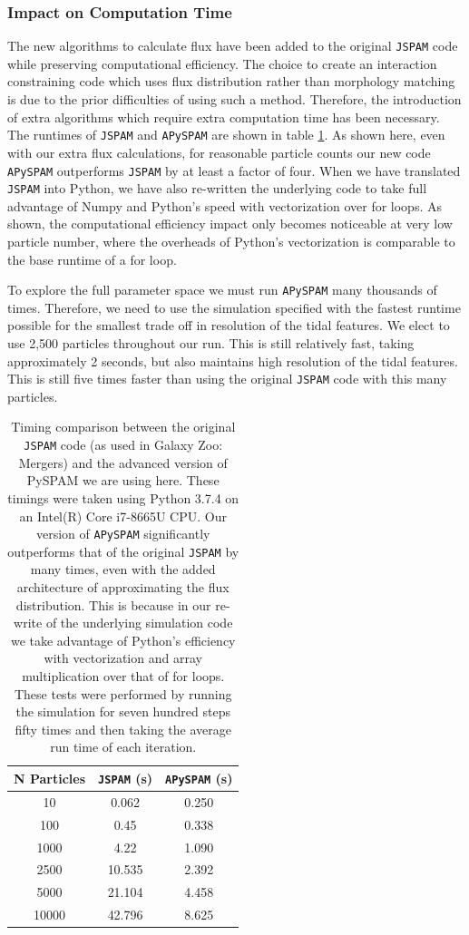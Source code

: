 \subsubsection{Impact on Computation Time}
The new algorithms to calculate flux have been added to the original \texttt{JSPAM} code while preserving computational efficiency. The choice to create an interaction constraining code which uses flux distribution rather than morphology matching is due to the prior difficulties of using such a method. Therefore, the introduction of extra algorithms which require extra computation time has been necessary. The runtimes of \texttt{JSPAM} and \texttt{APySPAM} are shown in table \ref{tab:timings}. As shown here, even with our extra flux calculations, for reasonable particle counts our new code \texttt{APySPAM} outperforms \texttt{JSPAM} by at least a factor of four. When we have translated \texttt{JSPAM} into Python, we have also re-written the underlying code to take full advantage of Numpy and Python's speed with vectorization over for loops. As shown, the computational efficiency impact only becomes noticeable at very low particle number, where the overheads of Python's vectorization is comparable to the base runtime of a for loop.

To explore the full parameter space we must run \texttt{APySPAM} many thousands of times. Therefore, we need to use the simulation specified with the fastest runtime possible for the smallest trade off in resolution of the tidal features. We elect to use 2,500 particles throughout our run. This is still relatively fast, taking approximately 2 seconds, but also maintains high resolution of the tidal features. This is still five times faster than using the original \texttt{JSPAM} code with this many particles. 

\begin{table}
\centering
\begin{tabular}{|c|c|c|}
\hline
N Particles & \texttt{JSPAM} (s) & \texttt{APySPAM} (s) \\
\hline
10 & 0.062 & 0.250 \\
100 & 0.45 & 0.338 \\
1000 & 4.22 & 1.090 \\
2500 & 10.535 & 2.392 \\
5000 & 21.104 & 4.458 \\
10000 & 42.796 & 8.625 \\
\hline
\end{tabular}
\caption{Timing comparison between the original \texttt{JSPAM} code (as used in Galaxy Zoo: Mergers) and the advanced version of PySPAM we are using here. These timings were taken using Python 3.7.4 on an Intel(R) Core i7-8665U CPU. Our version of \texttt{APySPAM} significantly outperforms that of the original \texttt{JSPAM} by many times, even with the added architecture of approximating the flux distribution. This is because in our re-write of the underlying simulation code we take advantage of Python's efficiency with vectorization and array multiplication over that of for loops. These tests were performed by running the simulation for seven hundred steps fifty times and then taking the average run time of each iteration.}
\label{tab:timings}
\end{table}

